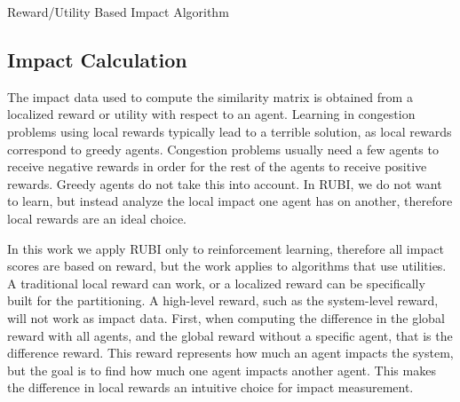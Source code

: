 \documentclass[onehalf,11pt]{beavtex}
\begin{document}
\begin{algorithm} \label{alg:RUBI}
  \caption{Reward/Utility Based Impact Algorithm}
  \begin{algorithmic}[1]
    \Statex
				\EndFor
		\EndFor
	\EndFor        
    \EndFunction
  \end{algorithmic}
\end{algorithm}


\subsection{Impact Calculation}

The impact data used to compute the similarity matrix is obtained from a localized reward or utility with respect to an agent. Learning in congestion problems using local rewards typically lead to a terrible solution, as local rewards correspond to greedy agents. Congestion problems usually need a few agents to receive negative rewards in order for the rest of the agents to receive positive rewards. Greedy agents do not take this into account. In RUBI, we do not want to learn, but instead analyze the local impact one agent has on another, therefore local rewards are an ideal choice.

In this work we apply RUBI only to reinforcement learning, therefore all impact scores are based on reward, but the work applies to algorithms that use utilities. A traditional local reward can work, or a localized reward can be specifically built for the partitioning. A high-level reward, such as the system-level reward, will not work as impact data. First, when computing the difference in the global reward with all agents, and the global reward without a specific agent, that is the difference reward. This reward represents how much an agent impacts the system, but the goal is to find how much one agent impacts another agent. This makes the difference in local rewards an intuitive choice for impact measurement.
\end{document}
